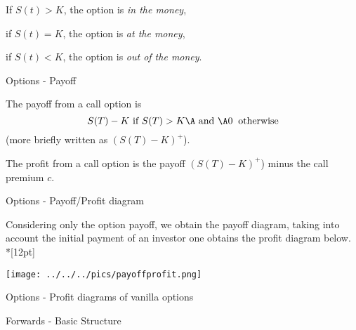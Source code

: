 



	If $S(t) > K$, the option is {\it in the money},


	if $S(t) = K$, the option is {\it at the money},


	if $S(t) < K$, the option is {\it out of the money}.





{Options - Payoff}







	The payoff from a call option is $$ S(T) - K \mbox{ if } S(T)
> K\A \mbox{ and }\A 0 \;\; \mbox{otherwise} $$ (more briefly
written as  $(S(T) - K)^+$).


	The profit from a call option is the payoff $(S(T) - K)^+$) minus the call premium $c$.





{Options - Payoff/Profit diagram }

Considering only the option payoff, we obtain the payoff diagram, taking into account the initial payment of an investor one obtains the profit diagram below.\\*[12pt]

\begin{center}
\texttt{[image: ../../../pics/payoffprofit.png]}
\end{center}

{Options - Profit diagrams of vanilla options}
\begin{figure}
  \centering
   \qquad
\end{figure}


{Forwards - Basic Structure}







